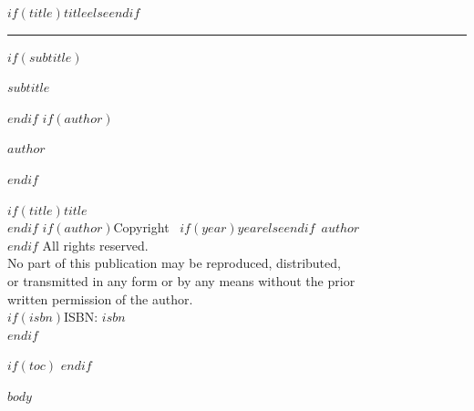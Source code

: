 \documentclass[%
  $if(fontsize)$$fontsize$$else$11pt$endif$,%
  $if(open-right)$openright$else$openany$endif$,%
  twoside%
]{book}
\begin{document}
\frontmatter
\pagestyle{empty}

\begin{titlepage}
  \centering
  {\Huge\bfseries\MakeUppercase{$if(title)$$title$$else$\relax$endif$}\par}
  \vspace{0.15in}
  \rule{0.35\textwidth}{0.4pt}\par
  $if(subtitle)$
  \vspace{0.2in}
  {\large\MakeUppercase{$subtitle$}\par}
  $endif$
  \vspace{0.8in}
  $if(author)$
  {\large\bfseries\MakeUppercase{$author$}\par}
  $endif$
\end{titlepage}

\clearpage
\thispagestyle{empty}
\vspace*{\fill}
\begin{center}
\small
$if(title)$\textit{$title$}\\[0.5em]$endif$
$if(author)$Copyright \textcopyright\ $if(year)$$year$$else$\the\year$endif$\ $author$\\[0.5em]$endif$
All rights reserved.\\[1em]
No part of this publication may be reproduced, distributed,\\
or transmitted in any form or by any means without the prior\\
written permission of the author.\\[1em]
$if(isbn)$ISBN: $isbn$\\[0.5em]$endif$
\end{center}
\vspace*{\fill}
\clearpage

$if(toc)$
\clearpage
\pagestyle{plain}
\tableofcontents
\clearpage
$endif$

\mainmatter
\pagestyle{bookbody}

$body$

\backmatter
\end{document}

